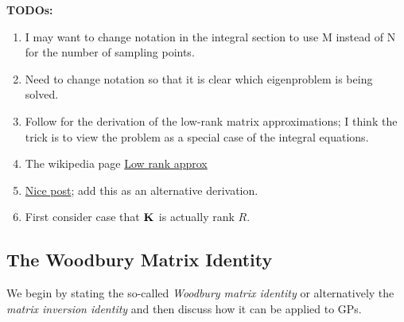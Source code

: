 \documentclass[12pt]{article}
\begin{document}
\bigskip
\textbf{TODOs:}
\begin{enumerate}
\item I may want to change notation in the integral section to use M instead of N for the number of sampling points. 
\item Need to change notation so that it is clear which eigenproblem is being solved.  
\item Follow \cite{Williams} for the derivation of the low-rank matrix approximations; I think the trick is to view the problem as a special case of the integral equations. 
\item The wikipedia page \href{https://en.wikipedia.org/wiki/Low-rank_matrix_approximations is also good.}{Low rank approx}
\item \href{https://stats.stackexchange.com/questions/261149/nystroem-method-for-kernel-approximation}{Nice post}; add this as an alternative derivation. 
\item First consider case that $\mathbf{K}_{}$ is actually rank $R$. 
\end{enumerate}

\subsection{The Woodbury Matrix Identity}
We begin by stating the so-called \textit{Woodbury matrix identity} or alternatively the \textit{matrix inversion identity} and then discuss how it can be applied to GPs. 
\end{document}
